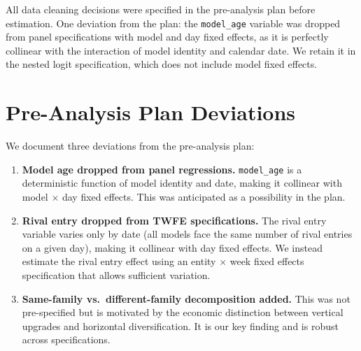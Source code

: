 \documentclass[11pt, a4paper]{article}
\begin{document}
\begin{appendices}
All data cleaning decisions were specified in the pre-analysis plan before estimation. One deviation from the plan: the \texttt{model\_age} variable was dropped from panel specifications with model and day fixed effects, as it is perfectly collinear with the interaction of model identity and calendar date. We retain it in the nested logit specification, which does not include model fixed effects.

\section{Pre-Analysis Plan Deviations}

We document three deviations from the pre-analysis plan:
\begin{enumerate}[nosep]
\item \textbf{Model age dropped from panel regressions.} \texttt{model\_age} is a deterministic function of model identity and date, making it collinear with model $\times$ day fixed effects. This was anticipated as a possibility in the plan.
\item \textbf{Rival entry dropped from TWFE specifications.} The rival entry variable varies only by date (all models face the same number of rival entries on a given day), making it collinear with day fixed effects. We instead estimate the rival entry effect using an entity $\times$ week fixed effects specification that allows sufficient variation.
\item \textbf{Same-family vs.\ different-family decomposition added.} This was not pre-specified but is motivated by the economic distinction between vertical upgrades and horizontal diversification. It is our key finding and is robust across specifications.
\end{enumerate}

\end{appendices}
\end{document}
